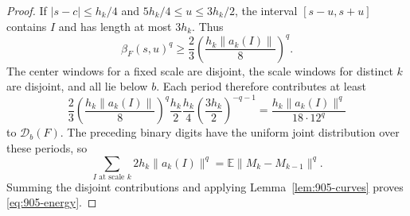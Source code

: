 \documentclass[11pt,a4paper]{article}
\theoremstyle{remark}
\begin{document}
\begin{proof}
If $|s-c|\leq h_k/4$ and $5h_k/4\leq u\leq3h_k/2$, the interval
$[s-u,s+u]$ contains $I$ and has length at most $3h_k$.  Thus
\[
 \beta_F(s,u)^q\geq\frac23
 \left(\frac{h_k\|a_k(I)\|}{8}\right)^q.
\]
The center windows for a fixed scale are disjoint, the scale windows
for distinct $k$ are disjoint, and all lie below $b$.  Each period
therefore contributes at least
\[
 \frac23\left(\frac{h_k\|a_k(I)\|}{8}\right)^q
 \frac{h_k}{2}\frac{h_k}{4}
 \left(\frac{3h_k}{2}\right)^{-q-1}
 =\frac{h_k\|a_k(I)\|^q}{18\cdot12^q}
\]
to $\mathcal D_b(F)$.  The preceding binary digits have the uniform
joint distribution over these periods, so
\[
 \sum_{I\text{ at scale }k}2h_k\|a_k(I)\|^q
 =\mathbb E\|M_k-M_{k-1}\|^q.
\]
Summing the disjoint contributions and applying
Lemma~\ref{lem:905-curves} proves \eqref{eq:905-energy}.
\end{proof}
\end{document}
